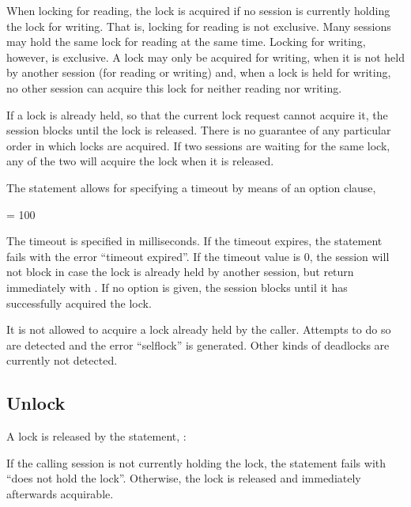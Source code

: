 When locking for reading, the lock is acquired if no session
is currently holding the lock for writing. That is,
locking for reading is not exclusive. Many sessions
may hold the same lock for reading at the same time.
Locking for writing, however, is exclusive.
A lock may only be acquired for writing,
when it is not held by another session
(for reading or writing) and,
when a lock is held for writing, no other session
can acquire this lock for neither reading nor writing.

If a lock is already held, so that the current
lock request cannot acquire it,
the session blocks until the lock is released.
There is no guarantee of any particular order
in which locks are acquired. If two sessions
are waiting for the same lock, any of the two
will acquire the lock when it is released.

The  statement allows for specifying
a timeout by means of an option clause, \eg

  
 = 100

The timeout is specified in milliseconds.
If the timeout expires, the statement fails with
the error ``timeout expired''.
If the timeout value is 0, the session will not block
in case the lock is already held by another session,
but return immediately with .
If no option is given, the session blocks until it
has successfully acquired the lock.

It is not allowed to acquire a lock already held
by the caller. Attempts to do so are detected and
the error ``selflock'' is generated.
Other kinds of deadlocks are currently not detected.

\subsection{Unlock}
A lock is released by the  statement, \eg:

 

If the calling session is not currently holding
the lock, the statement fails with ``does not hold the lock''.
Otherwise, the lock is released and immediately
afterwards acquirable.

